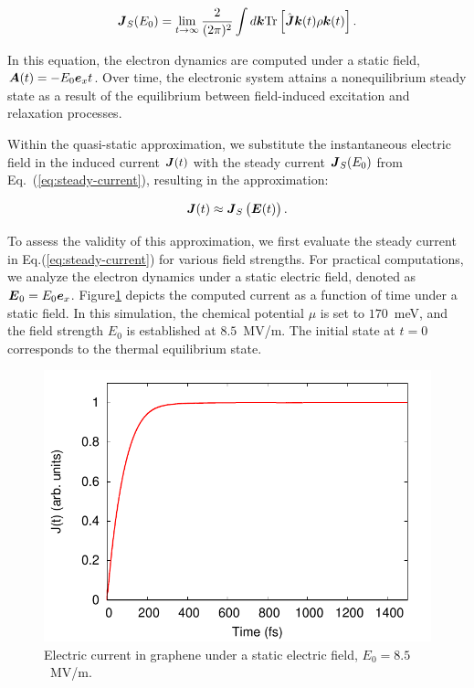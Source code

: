 \begin{align}
\boldsymbol J_S(E_0) = \lim_{t\rightarrow \infty}\frac{2}{(2\pi)^2}\int d\boldsymbol k \mathrm{Tr}\left[\hat{\boldsymbol{J}}{\boldsymbol{k}}(t)\rho{\boldsymbol{k}}(t)\right].
\label{eq:steady-current}
\end{align}

In this equation, the electron dynamics are computed under a static field, $\boldsymbol{A}(t)=-E_0
\boldsymbol{e}_x t$. Over time, the electronic system attains a nonequilibrium steady state as a result
of the equilibrium between field-induced excitation and relaxation processes. 

Within the quasi-static approximation, we substitute the instantaneous electric field in the induced current $\boldsymbol J(t)$ with the steady current $\boldsymbol J_S(E_0)$ from Eq.~(\ref{eq:steady-current}), resulting in the approximation:

\begin{align}
\boldsymbol J(t)\approx \boldsymbol J_S\left( \boldsymbol E(t) \right).
\label{eq:appendix-steady-current}
\end{align}

To assess the validity of this approximation, we first evaluate the steady current in
Eq.(\ref{eq:steady-current}) for various field strengths. For practical computations, we analyze
the electron dynamics under a static electric field, denoted as $\boldsymbol E_0=E_0\boldsymbol e_x$.
Figure\ref{fig:steady} depicts the computed current as a function of time under a static field. In this simulation, the chemical potential $\mu$ is set to $170$~meV, and the field strength $E_0$ is established at $8.5$~MV/m. The initial state at $t=0$ corresponds to the thermal equilibrium state.
\begin{figure}[htb]
    \centering
\includegraphics[width=0.8\linewidth]{pic/steady_current_appendix.pdf}
\caption{\label{fig:steady}
Electric current in graphene under a static electric field, $E_0=8.5$~MV/m.}
\end{figure}

